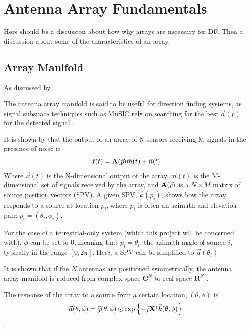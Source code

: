 \section{Antenna Array Fundamentals}
Here should be a discussion about how why arrays are necessary for DF. Then a discussion about some of the characteristics of an array.
\subsection{Array Manifold}
As discussed by \cite{sleiman2000antenna} \cite{karimi1996manifold} \cite{dacos1995estimating}. 

The antenna array manifold is said to be useful for direction finding systems, as signal subspace techniques such as MuSIC rely on searching for the best \(\vec{a}(p)\) for the detected signal \cite{karimi1996manifold}. 

It is shown by \cite{dacos1995estimating} that the output of an array of N sensors receiving M signals in the presence of noise is
\begin{equation}
\vec{x}(t) = \mathbf{A}(\vec{p})\vec{m}(t) + \vec{n}(t)
\end{equation}
Where \(\vec{x}(t)\) is the N-dimensional output of the array, \(\vec{m}(t)\) is the M-dimensional set of signals received by the array, and \(\mathbf{A}(\vec{p})\) is a \(N \times M\) matrix of source position vectors (SPV). 
A given SPV, \(\vec{a}(p_i)\), shows how the array responds to a source at location \(p_i\), where \(p_i\) is often an azimuth and elevation pair: \(p_i = (\theta_i, \phi_i)\).

For the case of a terrestrial-only system (which this project will be concerned with), \(\phi\) can be set to 0, meaning that \(p_i = \theta_i\), the azimuth angle of source \(i\), typically in the range \([0, 2\pi]\). Here, a SPV can be simplified to \(\vec{a}(\theta_i)\).

It is shown that if the \(N\) antennas are positioned symmetrically, the antenna array manifold is reduced from complex space \(\mathbf{C}^N\) to real space \(\mathbf{R}^N\) \cite{dacos1995estimating}.

The response of the array to a source from a certain location, \((\theta, \phi)\) is:
\begin{equation}
\vec{a}(\theta, \phi) = \vec{g}(\theta, \phi) \odot \exp \left\{ -j \mathbf{X}^\intercal \vec{k}(\theta,\phi) \right\}
\end{equation}
\cite{dacos1995estimating}.

